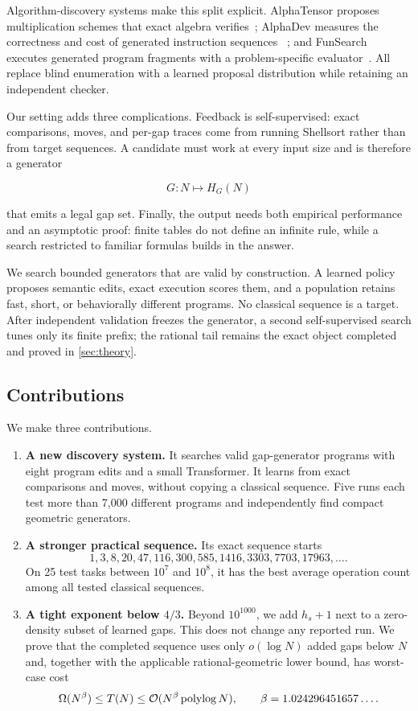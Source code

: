 Algorithm-discovery systems make this split explicit.  AlphaTensor proposes
multiplication schemes that exact algebra verifies~\cite{fawzi2022alphatensor};
AlphaDev measures the correctness and cost of generated instruction sequences
~\cite{mankowitz2023alphadev}; and FunSearch executes generated program
fragments with a problem-specific evaluator~\cite{romeraparedes2024funsearch}.
All replace blind enumeration with a learned proposal distribution while
retaining an independent checker.

Our setting adds three complications.  Feedback is self-supervised: exact
comparisons, moves, and per-gap traces come from running Shellsort rather than
from target sequences.  A candidate must work at every input size and is
therefore a generator

\[
  G:N\longmapsto H_G(N)
\]

that emits a legal gap set.  Finally, the output needs both empirical
performance and an asymptotic proof: finite tables do not define an infinite
rule, while a search restricted to familiar formulas builds in the answer.

We search bounded generators that are valid by construction.  A learned policy
proposes semantic edits, exact execution scores them, and a population retains
fast, short, or behaviorally different programs.  No classical sequence is a
target.  After independent validation freezes the generator, a second
self-supervised search tunes only its finite prefix; the rational tail remains
the exact object completed and proved in \cref{sec:theory}.

\subsection{Contributions}

We make three contributions.

\begin{enumerate}
  \item \textbf{A new discovery system.}  It searches valid gap-generator
  programs with eight program edits and a small Transformer.  It learns from
  exact comparisons and moves, without copying a classical sequence.  Five
  runs each test more than 7,000 different programs and independently find
  compact geometric generators.

  \item \textbf{A stronger practical sequence.}  Its exact sequence starts
  \[
    1,3,8,20,47,116,300,585,1416,3303,7703,17963,\ldots.
  \]
  On 25 test tasks between $10^7$ and $10^8$, it has the best average operation
  count among all tested classical sequences.

  \item \textbf{A tight exponent below $4/3$.}  Beyond $10^{1000}$, we add $h_s+1$ next
  to a zero-density subset of learned gaps.  This does not change any reported
  run.  We prove that the completed sequence uses only $o(\log N)$ added gaps
  below $N$ and, together with the applicable rational-geometric lower bound,
  has worst-case cost
  \[
    \Omega(N^\beta)\le T(N)\le
    \mathcal{O}(N^\beta\operatorname{polylog} N),
    \qquad \beta=1.024296451657\ldots.
  \]
\end{enumerate}
